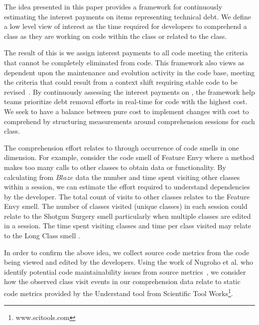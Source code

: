 The idea presented in this paper provides a framework for continuously estimating the interest payments on items representing technical debt.  We define a low level view of interest as the time required for developers to comprehend a class as they are working on code within the class or related to the class.   

The result of this is we assign interest payments to all code meeting the criteria that \TD cannot be completely eliminated from code.  This framework also views \TD as dependent upon the maintenance and evolution activity in the code base, meeting the criteria that \TD could result from a context shift requiring stable code to be revised~\cite{Ozkaya2012Technical}. By continuously assessing the interest payments on \TD, the framework help teams prioritize debt removal efforts in real-time for code with the highest cost.  We seek to have a balance between pure cost to implement changes with cost to comprehend by structuring measurements around comprehension sessions for each class.

The comprehension effort relates to \TD through occurrence of code smells in one dimension.  For example, consider the code smell of Feature Envy where a method makes too many calls to other classes to obtain data or functionality.  By calculating from $Blaze$ data the number and time spent visiting other classes within a session, we can estimate the effort required to understand dependencies by the developer.  The total count of visits to other classes relates to the Feature Envy smell.  The number of classes visited (unique classes) in each session could  relate to the Shotgun Surgery smell particularly when multiple classes are edited in a session.  The time spent visiting classes and time per class visited may relate to the Long Class smell \cite{Fowler_etal:1999}.  

In order to confirm the above idea, we collect source code metrics from the code being viewed and edited by the developers.  Using the work of Nugroho et al. who identify potential code maintainability issues from source metrics~\cite{Nugroho2011Empirical}, we consider how the observed class visit events in our comprehension data relate to static code metrics provided by the Understand tool from Scientific Tool Works\footnote{www.scitools.com}.   
